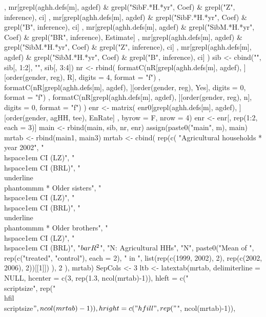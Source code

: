 \begin{Schunk}
\begin{Sinput}
{{       , 
       mr[grepl(aghh.defs[m], agdef) & grepl("SibF.*H.*yr", Coef) & grepl("Z", inference), ci]
       ,
       mr[grepl(aghh.defs[m], agdef) & grepl("SibF.*H.*yr", Coef) & grepl("B", inference), ci]
       ,
       mr[grepl(aghh.defs[m], agdef) & grepl("SibM.*H.*yr", Coef) & grepl("BR", inference), Estimate]
       , 
       mr[grepl(aghh.defs[m], agdef) & grepl("SibM.*H.*yr", Coef) & grepl("Z", inference), ci]
       ,
       mr[grepl(aghh.defs[m], agdef) & grepl("SibM.*H.*yr", Coef) & grepl("B", inference), ci]
     )
     sib <- cbind("", sib[, 1:2], "", sib[, 3:4])
     nr <- rbind(
        formatC(nR[grepl(aghh.defs[m], agdef), ][order(gender, reg), R], digits = 4, format = "f")
      , formatC(nR[grepl(aghh.defs[m], agdef), ][order(gender, reg), Yes], digits = 0, format = "f")
      , formatC(nR[grepl(aghh.defs[m], agdef), ][order(gender, reg), n], digits = 0, format = "f")
     )
     enr <- matrix(
       enr0[grepl(aghh.defs[m], agdef), ][order(gender, agHH, tee), EnRate]
       , byrow = F, nrow = 4)
     enr <- enr[, rep(1:2, each = 3)]
     main <- rbind(main, sib, nr, enr)
     assign(paste0("main", m), main)
  }
  mrtab <- rbind(main1, main3)
  mrtab <- 
    cbind(
        rep(c(
          "Agricultural households * year 2002", 
          "\\hspace{1em} CI (LZ)", "\\hspace{1em} CI (BRL)", 
          "\\underline{\\phantom{mm}} * Older sisters",
          "\\hspace{1em} CI (LZ)", "\\hspace{1em} CI (BRL)", 
          "\\underline{\\phantom{mm}} * Older brothers",
          "\\hspace{1em} CI (LZ)", "\\hspace{1em} CI (BRL)", 
          "$\\bar{R}^{2}$", "N: Agricultural HHs", "N",
          paste0("Mean of ", rep(c("treated", "control"), each = 2), " in ", 
            list(rep(c(1999, 2002), 2), rep(c(2002, 2006), 2))[[1]])
           ), 2
        ), 
     mrtab)
  SepCols <- 3
  ltb <- latextab(mrtab, delimiterline = NULL, 
      hcenter = c(3, rep(1.3, ncol(mrtab)-1)),
      hleft = c("\\scriptsize", rep("\\hfil\\scriptsize$", ncol(mrtab)-1)), 
      hright = c("\\hfill", rep("$", ncol(mrtab)-1)),
}
\end{Sinput}
\end{Schunk}
